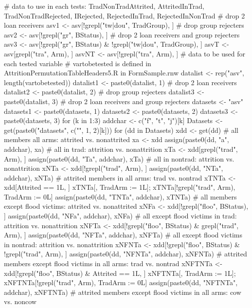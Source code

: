\begin{Schunk}
\begin{Sinput}
# data to use in each tests: TradNonTradAttrited, AttritedInTrad, TradNonTradRejected, IRejected, RejectedInTrad, RejectedInNonTrad
# drop 2 loan receivers
asv1 <- asv[!grepl("tw|dou", TradGroup), ]
# drop group rejecters
asv2 <- asv[!grepl("gr", BStatus), ]
# drop 2 loan receivers and group rejecters
asv3 <- asv[!grepl("gr", BStatus) & !grepl("tw|dou", TradGroup), ]
asvT <- asv[grepl("tra", Arm), ]
asvNT <- asv[!grepl("tra", Arm), ]
# data to be used for each tested variable
# vartobetested is defined in AttritionPermutationTableHeaders5.R in FormSample.rnw
datalist <- rep("asv", length(vartobetested))
datalist1 <- paste0(datalist, 1) # drop 2 loan receivers
datalist2 <- paste0(datalist, 2) # drop group rejecters
datalist3 <- paste0(datalist, 3) # drop 2 loan receivers and group rejecters
datasets <- "asv"
datasets1 <- paste0(datasets, 1)
datasets2 <- paste0(datasets, 2)
datasets3 <- paste0(datasets, 3)
for (k in 1:3) {
  addchar <- c("f", "t", "j")[k]
  Datasets <- get(paste0("datasets", c("", 1, 2)[k]))
  for (dd in Datasets) {
    xdd <- get(dd)
    # all members all arms: attrited vs. nonattrited
    xa <- xdd
    assign(paste0(dd, "a", addchar), xa)
    # all in trad: attrition vs. nonattrition
    xTa <- xdd[grepl("trad", Arm), ]
    assign(paste0(dd, "Ta", addchar), xTa)
    # all in nontrad: attrition vs. nonattrition
    xNTa <- xdd[!grepl("trad", Arm), ]
    assign(paste0(dd, "NTa", addchar), xNTa)
    # attrited members in all arms: trad vs. nontrad
    xTNTa <- xdd[Attrited == 1L, ]
    xTNTa[, TradArm := 1L]; xTNTa[!grepl("trad", Arm), TradArm := 0L]
    assign(paste0(dd, "TNTa", addchar), xTNTa)
    # all members except flood victims: attrited vs. nonattrited
    xNFa <- xdd[!grepl("floo", BStatus), ]
    assign(paste0(dd, "NFa", addchar), xNFa)
    # all except flood victims in trad: attrition vs. nonattrition
    xNFTa <- xdd[!grepl("floo", BStatus) & grepl("trad", Arm), ]
    assign(paste0(dd, "NFTa", addchar), xNFTa)
    # all except flood victims in nontrad: attrition vs. nonattrition
    xNFNTa <- xdd[!grepl("floo", BStatus) & !grepl("trad", Arm), ]
    assign(paste0(dd, "NFNTa", addchar), xNFNTa)
    # attrited members except flood victims in all arms: trad vs. nontrad
    xNFTNTa <- xdd[!grepl("floo", BStatus) & Attrited == 1L, ]
    xNFTNTa[, TradArm := 1L]; xNFTNTa[!grepl("trad", Arm), TradArm := 0L]
    assign(paste0(dd, "NFTNTa", addchar), xNFTNTa)
    # attrited members except flood victims in all arms: cow vs. noncow
}}
\end{Sinput}
\end{Schunk}
